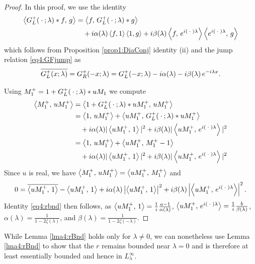 \documentclass[../dissertation.tex]{subfiles}
\begin{document}
\begin{proof}
	In this proof, we use the identity 
	\begin{align*}
		\left\langle G_L^+(\kern 0.5ex \cdot \kern 0.5ex; \lambda)*f, \, g \right\rangle
			&= \left\langle f, \, G_L^+(\kern 0.5ex \cdot \kern 0.5ex; \lambda)*g \right\rangle \\
			&\quad+ i\alpha(\lambda) \left\langle f,1 \right\rangle\left\langle 1,g \right\rangle
				+ i\beta(\lambda) \left\langle f, \, e^{i(\kern 0.5ex \cdot \kern 0.5ex)\lambda} \right\rangle
					\left\langle e^{i(\kern 0.5ex \cdot \kern 0.5ex)\lambda}, \, g \right\rangle
	\end{align*}
	which follows from Proposition \ref{prop1:DiaConj} identity (ii) and
	the jump relation \eqref{eq4:GFjump} as 
	\begin{align*}
		\overline{G_L^+(x; \lambda)}
			= G_R^+(-x; \lambda)
			= G_L^+(-x; \lambda) - i \alpha(\lambda) - i \beta(\lambda) \, e^{-i\lambda x}.
	\end{align*}

	Using $M_1^+ = 1 + G_L^+ (\kern 0.5ex \cdot \kern 0.5ex; \lambda) * u M_1$ we compute
	\begin{align*}
		\left\langle M_1^+, \, uM_1^+ \right\rangle
			&= \left\langle 1 + G_L^+ (\kern 0.5ex \cdot \kern 0.5ex; \lambda) * u M_1^+, \, uM_1^+ \right\rangle \\
			&= \left\langle 1, \, uM_1^+ \right\rangle + \left\langle uM_1^+, \, G_L^+ (\kern 0.5ex \cdot \kern 0.5ex; \lambda) * u M_1^+ \right\rangle \\
			&\quad+ i \alpha(\lambda) |\left\langle uM_1^+,\,1 \right\rangle|^2 
				+ i \beta(\lambda) |\left\langle uM_1^+,\,e^{i(\kern 0.5ex \cdot \kern 0.5ex)\lambda} \right\rangle|^2 \\
			&=  \left\langle 1, \, uM_1^+ \right\rangle + \left\langle uM_1^+, \, M_1^+ - 1 \right\rangle \\
			&\quad+ i \alpha(\lambda) |\left\langle uM_1^+,\,1 \right\rangle|^2 
				+ i \beta(\lambda) |\left\langle uM_1^+,\,e^{i(\kern 0.5ex \cdot \kern 0.5ex)\lambda} \right\rangle|^2
	\end{align*}
	Since $u$ is real, we have $\left\langle M_1^+, \, u M_1^+ \right\rangle = \left\langle uM_1^+, \, M_1^+ \right\rangle$ and
	\begin{align*}
		0 = 
			\overline{\left\langle uM_1^+, \, 1 \right\rangle} - \left\langle uM_1^+, \, 1 \right\rangle
			+ i \alpha(\lambda) \left|\left\langle uM_1^+, \, 1 \right\rangle \right|^2
			+ i \beta(\lambda) \left|\left\langle uM_1^+, \, e^{i(\kern 0.5ex \cdot \kern 0.5ex)\lambda} \right\rangle \right|^2.
	\end{align*}
	Identity \ref{eq4:rbnd} then follows, as 
	$\left\langle uM_1^+, \,1 \right\rangle = \frac{1}{i} \frac{a-1}{\alpha(\lambda)}$, 
	$\left\langle uM_1^+, \, e^{i(\kern 0.5ex \cdot \kern 0.5ex)\lambda} \right\rangle = \frac{1}{i} \frac{b}{\beta(\lambda)}$, 
	$\alpha(\lambda) = \frac{1}{1-2\zeta(\lambda)}$, and $\beta(\lambda) = \frac{1}{1-2\zeta(-\lambda)}$.
\end{proof}

While Lemma \ref{lma4:rBnd} holds only for $\lambda \ne 0$, we can nonetheless use 
Lemma \ref{lma4:rBnd} to show that the $r$ remains bounded near $\lambda = 0$ and is 
therefore at least essentially bounded and hence in $L_\lambda^\infty$. 
\end{document}

